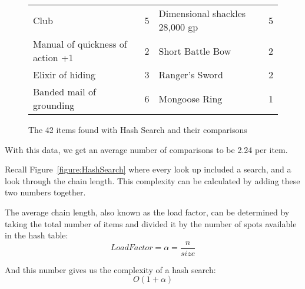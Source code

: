 \documentclass[letterpaper, 10pt,DIV=13]{scrartcl}
\numberwithin{equation}{section} %
\numberwithin{figure}{section} %
\numberwithin{table}{section} %
\begin{document}
\begin{figure} [h]
\begin{tabular}{||lc||lc||}
    Club & 5&Dimensional shackles    28,000 gp & 5\\
     
    Manual of quickness of action +1 & 2&Short Battle Bow & 2\\
     
    Elixir of hiding & 3&Ranger's Sword & 2\\
     
    Banded mail of grounding & 6&Mongoose Ring & 1\\
     \hline

    \end{tabular}
    \caption{The 42 items found with Hash Search and their comparisons}
    \label{figure:HashResults}
\end{figure}

With this data, we get an average number of comparisons to be 2.24 per item. 

Recall Figure~\ref{figure:HashSearch} where every look up included a search, and a look through the chain length. This complexity can be calculated by adding these two numbers together. 

The average chain length, also known as the load factor, can be determined by taking the total number of items and divided it by the number of spots available in the hash table:
\[Load Factor = \alpha = \frac{n}{size}\] 

And this number gives us the complexity of a hash search:
\[O(1+\alpha)\]
\end{document}
